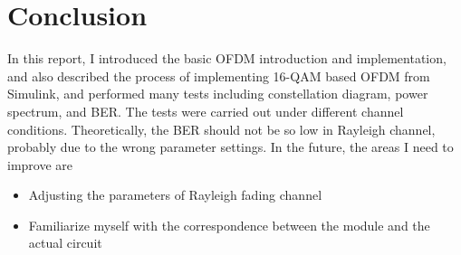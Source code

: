 \documentclass[10pt]{article}
\numberwithin{figure}{section}
\numberwithin{equation}{section}
\begin{document}
\part{Conclusion}
In this report, I introduced the basic OFDM introduction and implementation, and also described the process of implementing 16-QAM based OFDM from Simulink, and performed many tests including constellation diagram, power spectrum, and BER. The tests were carried out under different channel conditions. Theoretically, the BER should not be so low in Rayleigh channel, probably due to the wrong parameter settings.
In the future, the areas I need to improve are
\begin{itemize}
    \item Adjusting the parameters of Rayleigh fading channel
    \item Familiarize myself with the correspondence between the module and the actual circuit
\end{itemize}

\pagebreak


\end{document}
